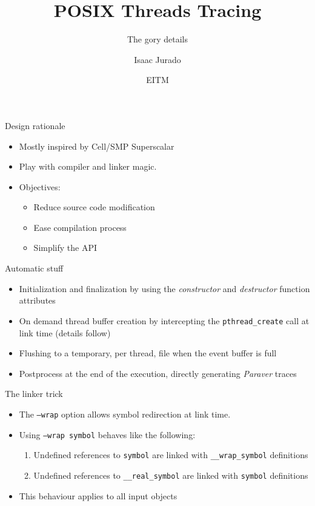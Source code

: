 \documentclass{beamer}
\title{POSIX Threads Tracing}
\subtitle{The gory details}
\author{Isaac Jurado}
\date{EITM}
\begin{document}
\maketitle

\begin{frame}{Design rationale}
  \begin{itemize}
    \item Mostly inspired by Cell/SMP Superscalar
    \item Play with compiler and linker magic.
    \item Objectives:
    \begin{itemize}
      \item Reduce source code modification
      \item Ease compilation process
      \item Simplify the API
    \end{itemize}
  \end{itemize}
\end{frame}

\begin{frame}{Automatic stuff}
  \begin{itemize}
    \item Initialization and finalization by using the \emph{constructor} and
    \emph{destructor} function attributes
    \item On demand thread buffer creation by intercepting the
    \texttt{pthread\_create} call at link time (details follow)
    \item Flushing to a temporary, per thread, file when the event buffer is
    full
    \item Postprocess at the end of the execution, directly generating
    \emph{Paraver}\textregistered{} traces
  \end{itemize}
\end{frame}

\begin{frame}{The linker trick}
  \begin{itemize}
    \item The \texttt{--wrap} option allows symbol redirection at link time.
    \item Using \texttt{--wrap symbol} behaves like the following:
    \begin{enumerate}
      \item Undefined references to \texttt{symbol} are linked with
      \texttt{\_\_wrap\_symbol} definitions
      \item Undefined references to \texttt{\_\_real\_symbol} are linked with
      \texttt{symbol} definitions
    \end{enumerate}
    \item This behaviour applies to all input objects
  \end{itemize}
\end{frame}
\end{document}
